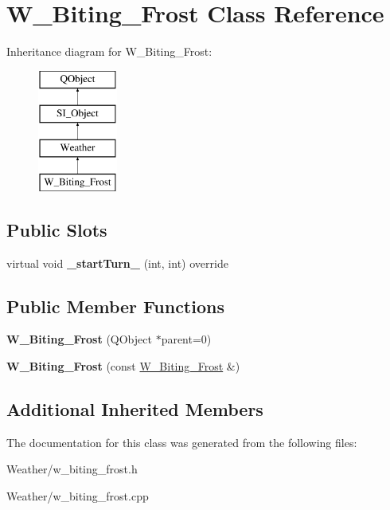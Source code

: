\hypertarget{class_w___biting___frost}{}\section{W\+\_\+\+Biting\+\_\+\+Frost Class Reference}
\label{class_w___biting___frost}
Inheritance diagram for W\+\_\+\+Biting\+\_\+\+Frost\+:\begin{figure}[H]
\begin{center}
\leavevmode
\includegraphics[height=4.000000cm]{class_w___biting___frost}
\end{center}
\end{figure}
\subsection*{Public Slots}
\begin{DoxyCompactItemize}
\item 
\mbox{\label{class_w___biting___frost_aa751b991c92f66299ab3ed2ae68ba6e1}} 
virtual void {\bfseries \+\_\+start\+Turn\+\_\+} (int, int) override
\end{DoxyCompactItemize}
\subsection*{Public Member Functions}
\begin{DoxyCompactItemize}
\item 
\mbox{\label{class_w___biting___frost_a6c88bb0cd728fc8a42efd14380f60d5c}} 
{\bfseries W\+\_\+\+Biting\+\_\+\+Frost} (Q\+Object $\ast$parent=0)
\item 
\mbox{\label{class_w___biting___frost_a78fdc9b086daff7f961ae07fad7a06f9}} 
{\bfseries W\+\_\+\+Biting\+\_\+\+Frost} (const \hyperlink{class_w___biting___frost}{W\+\_\+\+Biting\+\_\+\+Frost} \&)
\end{DoxyCompactItemize}
\subsection*{Additional Inherited Members}


The documentation for this class was generated from the following files\+:\begin{DoxyCompactItemize}
\item 
Weather/w\+\_\+biting\+\_\+frost.\+h\item 
Weather/w\+\_\+biting\+\_\+frost.\+cpp\end{DoxyCompactItemize}
